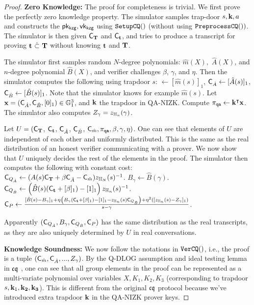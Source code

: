 \begin{proof} 
{\bf Zero Knowledge:} The proof for completeness is trivial. We first
prove the perfectly zero knowledge property.
The simulator samples trap-door $s, {{\mathbf {k}}}, a$
and constructs the $\mathsf{pk_{kzg}}, \mathsf{vk_{kzg}}$ using
${\texttt{SetupCQ}}()$ (without using ${\texttt{PreprocessCQ}}())$.  
The simulator is then given ${\mathsf{C}}_{{{\mathbf {T}}}}$
and ${\mathsf{C}}_{{{\mathbf {t}}}}$, and tries to produce a transcript
for proving ${{\mathbf {t}}} ~\hat{\subset}~ {{\mathbf {T}}}$ without knowing
${{\mathbf {t}}}$ and ${{\mathbf {T}}}$.

The simulator first samples random $N$-degree polynomials:
$\hat{m}(X),$ $\hat{A}(X)$, and $n$-degree polynomial 
$\hat{B}(X)$, and verifier challenges $\beta$, $\gamma$, and $\eta$. Then the
simulator computes the following using trapdoor $s$:
$\bm \leftarrow [\hat{m}(s)]_1$,
${{\mathsf{C}}_{\hat{A}}} \leftarrow [\hat{A}(s)]_1$,
${{\mathsf{C}}_{\hat{B}}} \leftarrow [\hat{B}(s)]_1$. Note that the simulator
knows for example $\hat{m}(s)$.
Let ${{\mathbf {x}}} = ({{\mathsf{C}}_{\hat{A}}}, {{\mathsf{C}}_{\hat{B}}}, [0]_1) \in {\mathbb{G}}_1^{3}$, and ${{\mathbf {k}}}$
the trapdoor in QA-NIZK. 
Compute $\pi_{\texttt{qa}} \leftarrow {{\mathbf {k}}}^\intercal  {{\mathbf {x}}}$.  
The simulator also computes $Z_\gamma = z_{\mathbb{H}_{n}}(\gamma)$.

Let $U = ({\mathsf{C}}_{{{\mathbf {T}}}}$,
${\mathsf{C}}_{{{\mathbf {t}}}}$,
${{\mathsf{C}}_{\hat{A}}}$, ${{\mathsf{C}}_{\hat{B}}}$, ${{\mathsf{C}}_{\hat{m}}}, \pi_{\texttt{qa}}, \beta, \gamma, \eta)$. One can see that
elements of $U$ are independent of each other and
uniformly distributed. This is the same as the real distribution
of an honest verifier communicating with a prover.
We now show that $U$ uniquely decides the rest of the elements
in the proof. 
The simulator then computes the following with constant cost: \newline
${\mathsf{C}}_{{Q_{\hat{A}}}} \leftarrow (A(s) 
{\mathsf{C}}_{{{\mathbf {T}}}} + \beta {{\mathsf{C}}_{\hat{A}}} - {{\mathsf{C}}_{\hat{m}}})z_{\mathbb{H}_{N}}(s)^{-1}$. \newline
$B_\gamma \leftarrow \hat{B}(\gamma)$. \newline
${{\mathsf{C}}_{Q_{\hat{B}}}} \leftarrow \left(
\hat{B}(s)({\mathsf{C}}_{{{\mathbf {t}}}} + [\beta]_1) - [1]_1
\right) z_{\mathbb{H}_{n}}(s)^{-1}$.
\newline
${{\mathsf{C}}_{P}} \leftarrow \frac{[\hat{B}(s) - B_\gamma]_1 + 
\eta \left(B_\gamma \left({{\mathsf{C}}_{{{\mathbf {t}}}}} + [\beta]_1\right)-[1]_1 - z_{\mathbb{H}_{n}}(s) {{\mathsf{C}}_{Q_{\hat{B}}}} \right)
+ \eta^2([z_{\mathbb{H}_{n}}(s) - Z_\gamma]_1)
	}{s-\gamma}$. \newline

Apparently $({\mathsf{C}}_{{Q_{\hat{A}}}}, B_\gamma, {{\mathsf{C}}_{Q_{\hat{B}}}}, {{\mathsf{C}}_{P}})$ has 
the same distribution as the real transcripts, as they are
also uniquely determined by $U$ in real conversations.

{\bf Knowledge Soundness:} 
We now follow the notations in ${\texttt{VerCQ}}()$, i.e.,
the proof is a tuple $({{\mathsf{C}}_{\hat{m}}}, {{\mathsf{C}}_{\hat{A}}}, ..., Z_\gamma)$.
By the Q-DLOG assumption and
ideal testing lemma in ${\mathfrak{cq}}$ \cite{cq}, one can see that all group elements
in the proof can be represented as a multi-variate polynomial
over variables $X, K_1, K_2, K_3$ (corresponding to trapdoor
$s,{{\mathbf {k}}}_1, {{\mathbf {k_2}}}, {{\mathbf {k_3}}}$). This is different
from the original ${\mathfrak{cq}}$ protocol because we've introduced extra
trapdoor ${{\mathbf {k}}}$ in the QA-NIZK prover keys.


\end{proof}
